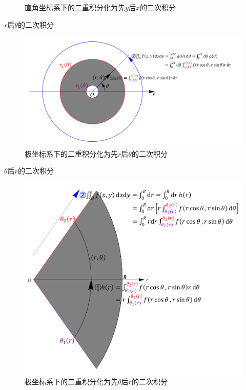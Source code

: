 \documentclass[12pt,UTF8]{ctexart}
\begin{document}
\begin{enumerate}
\begin{figure}[H]
\begin{center}
\end{center}
\caption{直角坐标系下的二重积分化为先$y$后$x$的二次积分}
\end{figure}
$r$后$\theta$的二次积分
\begin{figure}[H]
\begin{center}
\includegraphics[height=0.4\textheight,angle=0]{Figures20190611/Polarr2t.pdf}
\end{center}
\caption{极坐标系下的二重积分化为先$r$后$\theta$的二次积分}
\end{figure}
$\theta$后$r$的二次积分
\begin{figure}[H]
\begin{center}
\includegraphics[height=0.5\textheight,angle=0]{Figures20190611/Polart2r.pdf}
\end{center}
\caption{极坐标系下的二重积分化为先$\theta$后$r$的二次积分}
\end{figure}
\end{enumerate}
\end{document}
